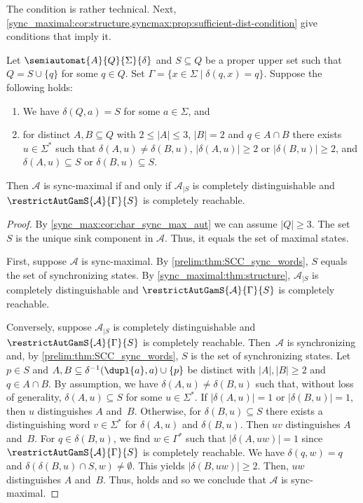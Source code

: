 The condition  
is rather technical. Next, \cref{sync_maximal:cor:structure,syncmax:prop:sufficient-dist-condition} 
give conditions that imply it.

\begin{corollary} \label{sync_maximal:cor:structure}
	Let $\semiautomat{A}{Q}{\Sigma}{\delta}$ and $S \subseteq Q$
	be a proper upper set such that $Q = S \cup \{q\}$ for some $q \in Q$.
	Set $\Gamma = \{ x \in \Sigma \mid \delta(q, x) = q \}$.
	Suppose the following holds:
	\begin{enumerate}
	\item We have $\delta(Q,a) = S$ for some $a \in \Sigma$, and
	
    \item \label{sync_maximal:cor:structure:2} for distinct $A,B \subseteq Q$ with $2 \le |A| \le 3$, $|B| = 2$
    and $q \in A \cap B$
    there exists $u \in \Sigma^*$ such that  $\delta(A, u) \ne \delta(B, u)$,
    $|\delta(A, u)| \ge 2$ or $|\delta(B, u)| \ge 2$,
    and $\delta(A, u) \subseteq S$
    or $\delta(B, u) \subseteq S$.	
	\end{enumerate}
	Then $\mathcal A$ is sync-maximal if and only if 
	$\mathcal A_{|S}$ is completely distinguishable
	and $\restrictAutGamS{\mathcal A}{\Gamma}{S}$ is completely reachable.
\end{corollary}
\begin{proof}
	By \cref{sync_max:cor:char_sync_max_aut} we can assume $|Q| \ge 3$.
	The set~$S$ is the unique sink component in $\mathcal A$.
	Thus, it equals the set of maximal states.
	
	First, suppose $\mathcal A$ is sync-maximal.
	By \cref{prelim:thm:SCC_sync_words}, $S$ equals the set of synchronizing states.
	By \cref{sync_maximal:thm:structure}, $\mathcal A_{|S}$ is completely distinguishable
	and $\restrictAutGamS{\mathcal A}{\Gamma}{S}$ is completely reachable.
	
	Conversely, suppose $\mathcal A_{|S}$ is completely distinguishable
	and $\restrictAutGamS{\mathcal A}{\Gamma}{S}$ is completely reachable.
	Then~$\mathcal A$ is synchronizing and, by \cref{prelim:thm:SCC_sync_words}, $S$
	is the set of synchronizing states.	
	Let $p \in S$ and $A,B \subseteq \delta^{-1}(\dupl{a}, a) \cup \{p\}$
	be distinct with $|A|, |B| \ge 2$ and $q \in A \cap B$.
	By assumption, we have $\delta(A, u) \ne \delta(B, u)$
	such that, without loss of generality, $\delta(A, u) \subseteq S$
	for some $u \in \Sigma^*$.
	If $|\delta(A, u)| = 1$ or $|\delta(B, u)| = 1$, 
	then $u$ distinguishes $A$ and~$B$.
	Otherwise, for $\delta(B, u) \subseteq S$ there exists a distinguishing word $v \in \Sigma^*$
	for $\delta(A, u)$ and $\delta(B, u)$. Then $uv$ distinguishes $A$ and~$B$.
	For $q \in \delta(B, u)$, we find $w \in \Gamma^*$
	such that $|\delta(A, uw)| = 1$ since $\restrictAutGamS{\mathcal A}{\Gamma}{S}$ is completely reachable.
	We have $\delta(q, w) = q$
	and $\delta(\delta(B, u) \cap S, w) \ne \emptyset$.
	This yields $|\delta(B, uw)| \ge 2$.
	Then, $uw$ distinguishes $A$ and~$B$.
	Thus,  
	holds and so we conclude that $\mathcal A$ is sync-maximal.
\end{proof}

